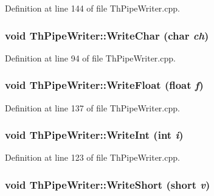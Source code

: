 Definition at line 144 of file ThPipeWriter.cpp.\hypertarget{class_th_pipe_writer_7b7180984049c3dcb29db2342eda82a2}{
\subsubsection[{WriteChar}]{\setlength{\rightskip}{0pt plus 5cm}void ThPipeWriter::WriteChar (char {\em ch})}}
\label{class_th_pipe_writer_7b7180984049c3dcb29db2342eda82a2}




Definition at line 94 of file ThPipeWriter.cpp.\hypertarget{class_th_pipe_writer_f34f1ac09c81ad04f88ce389d2f97056}{
\subsubsection[{WriteFloat}]{\setlength{\rightskip}{0pt plus 5cm}void ThPipeWriter::WriteFloat (float {\em f})}}
\label{class_th_pipe_writer_f34f1ac09c81ad04f88ce389d2f97056}




Definition at line 137 of file ThPipeWriter.cpp.\hypertarget{class_th_pipe_writer_911ab6f8669f8c96658f2e539a6f4e84}{
\subsubsection[{WriteInt}]{\setlength{\rightskip}{0pt plus 5cm}void ThPipeWriter::WriteInt (int {\em i})}}
\label{class_th_pipe_writer_911ab6f8669f8c96658f2e539a6f4e84}




Definition at line 123 of file ThPipeWriter.cpp.\hypertarget{class_th_pipe_writer_aa8a14daeae216278150cca3e0ff505d}{
\subsubsection[{WriteShort}]{\setlength{\rightskip}{0pt plus 5cm}void ThPipeWriter::WriteShort (short {\em v})}}
\label{class_th_pipe_writer_aa8a14daeae216278150cca3e0ff505d}




